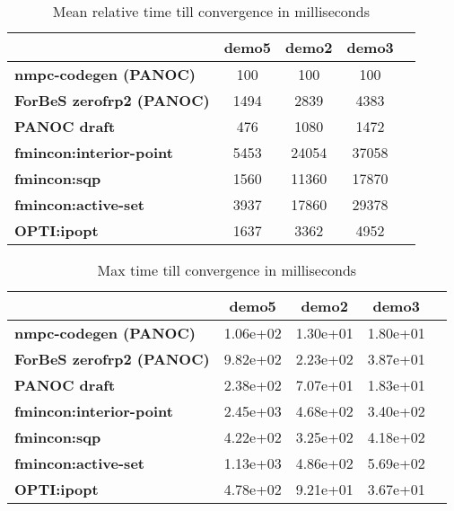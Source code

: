 \begin{table}[H]
	\centering
	\begin{tabular}{|l|c|c|c|c|}
		\hline
		&\textbf{demo5}&\textbf{demo2}&\textbf{demo3}\\\hline
		\textbf{nmpc-codegen (PANOC)}&100&100&100\\\hline
		\textbf{ForBeS zerofrp2 (PANOC)}&1494&2839&4383\\\hline
		\textbf{PANOC draft}&476&1080&1472\\\hline
		\textbf{fmincon:interior-point}&5453&24054&37058\\\hline
		\textbf{fmincon:sqp}&1560&11360&17870\\\hline
		\textbf{fmincon:active-set}&3937&17860&29378\\\hline
		\textbf{OPTI:ipopt}&1637&3362&4952\\\hline
	\end{tabular}
	\caption{Mean relative time till convergence in milliseconds}
	\label{tbl:mean relative time till convergence with noise}
\end{table}

\begin{table}[H]
	\centering
	\begin{tabular}{|l|c|c|c|c|}
		\hline
		&\textbf{demo5}&\textbf{demo2}&\textbf{demo3}\\\hline
		\textbf{nmpc-codegen (PANOC)}&1.06e+02&1.30e+01&1.80e+01\\\hline
		\textbf{ForBeS zerofrp2 (PANOC)}&9.82e+02&2.23e+02&3.87e+01\\\hline
		\textbf{PANOC draft}&2.38e+02&7.07e+01&1.83e+01\\\hline
		\textbf{fmincon:interior-point}&2.45e+03&4.68e+02&3.40e+02\\\hline
		\textbf{fmincon:sqp}&4.22e+02&3.25e+02&4.18e+02\\\hline
		\textbf{fmincon:active-set}&1.13e+03&4.86e+02&5.69e+02\\\hline
		\textbf{OPTI:ipopt}&4.78e+02&9.21e+01&3.67e+01\\\hline
	\end{tabular}
	\caption{Max time till convergence in milliseconds}
	\label{tbl:max time till convergence with noise}
\end{table}

